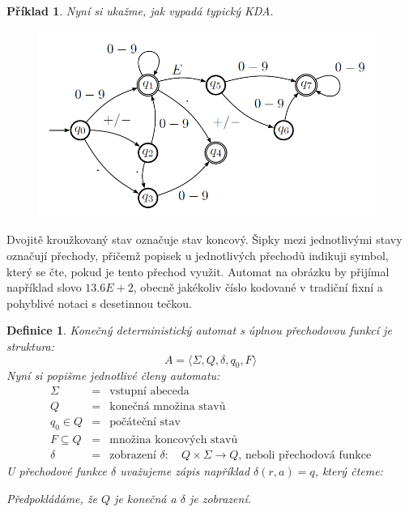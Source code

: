 \documentclass[10pt,a4paper]{article}
\theoremstyle{note}
\newtheorem{definice}{Definice}
\newtheorem{priklad}{Příklad}
\begin{document}
\begin{priklad}
Nyní si ukažme, jak vypadá typický KDA.

\begin{figure}[H]
\begin{center}
\includegraphics[width=11cm]{img/KDA-priklad.png}
\end{center}
\end{figure}
\end{priklad}

Dvojitě kroužkovaný stav označuje stav koncový. Šipky mezi jednotlivými stavy označují přechody, přičemž popisek u jednotlivých přechodů
indikuji symbol, který se čte, pokud je tento přechod využit. Automat na obrázku  by přijímal například slovo $13.6E+2$, obecně
jakékoliv číslo kodované v tradiční fixní a pohyblivé notaci s desetinnou tečkou.

\begin{definice}
Konečný deterministický automat s úplnou přechodovou funkcí je struktura:
$$
A = \langle \Sigma, Q, \delta, q_0, F \rangle
$$
Nyní si popišme jednotlivé členy automatu:
\begin{eqnarray*}
\Sigma &=& \text{vstupní abeceda} \\
Q &=& \text{konečná množina stavů} \\
q_0 \in Q &=& \text{počáteční stav} \\
F \subseteq Q &=& \text{množina koncových stavů} \\
\delta &=& \text{zobrazení } \delta:\quad Q \times \Sigma \rightarrow Q \text{, neboli přechodová funkce}
\end{eqnarray*}
U přechodové funkce $\delta$ uvažujeme zápis například $\delta(r, a) = q$, který čteme: 

Předpokládáme, že $Q$ je konečná a $\delta$ je zobrazení.
\end{definice}
\end{document}
